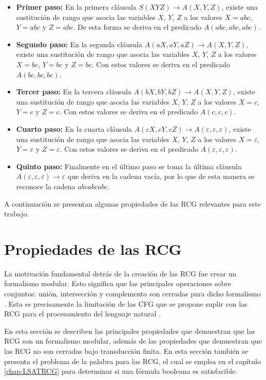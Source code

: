 \documentclass[12pt]{article}
\begin{document}
\begin{itemize}
    \item \textbf{Primer paso:} En la primera cláusula $S(XYZ)\to A(X,Y,Z)$, existe una sustitución de rango que asocia las variables $X$, $Y$, $Z$ a los valores $X=abc$, $Y=abc$ y $Z=abc$. De esta forma se deriva en el predicado $A(abc,abc,abc)$.
    \item \textbf{Segundo paso:} En la segunda cláusula $A(aX,aY,aZ)\to A(X,Y,Z)$, existe una sustitución de rango que asocia las
          variables $X$, $Y$, $Z$ a los valores $X=bc$, $Y=bc$ y $Z=bc$. Con estos valores se deriva en el predicado $A(bc,bc,bc)$.
    \item \textbf{Tercer paso:} En la tercera cláusula $A(bX,bY,bZ)\to A(X,Y,Z)$, existe una sustitución de rango que asocia las
          variables $X$, $Y$, $Z$ a los valores $X=c$, $Y=c$ y $Z=c$. Con estos valores se deriva en el predicado $A(c,c,c)$.
    \item \textbf{Cuarto paso:} En la cuarta cláusula $A(cX,cY,cZ)\to A(\varepsilon,\varepsilon,\varepsilon)$, existe una sustitución de rango que asocia las variables $X$, $Y$, $Z$ a los valores $X=\varepsilon$, $Y=\varepsilon$ y $Z=\varepsilon$. Con estos valores se deriva en el predicado $A(\varepsilon,\varepsilon,\varepsilon)$.
    \item \textbf{Quinto paso:} Finalmente en el último paso se toma la última cláusula $A(\varepsilon,\varepsilon,\varepsilon)\to \varepsilon$ que deriva en la cadena vacía, por lo que de esta manera se reconoce la cadena $abcabcabc$.
\end{itemize}


A continuación se presentan algunas propiedades de las RCG relevantes para este trabajo.

\section{Propiedades de las RCG}

La motivación fundamental detrás de la creación de las RCG fue crear un formalismo modular. Esto significa que las principales operaciones sobre conjuntos: unión, intersección y complemento son cerradas para dicho formalismo \cite{mainRCGBib}.  Esta es precisamente la limitación de las CFG que se propone suplir con las RCG para el procesamiento del lenguaje natural \cite{mainRCGBib}.

En esta sección se describen las principales propiedades que demuestran que las RCG son un formalismo
modular, además de las propiedades que demuestran que las RCG no son cerradas 
bajo transducción finita. En esta sección también se presenta el problema de la palabra 
para las RCG, el cual se emplea en el capítulo \ref{chap:LSATRCG} para determinar si una fórmula booleana es satisfacible.
\end{document}
